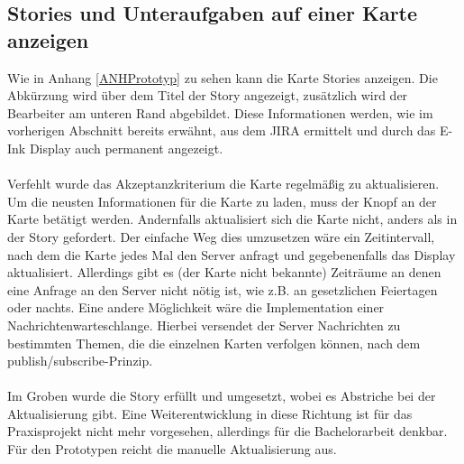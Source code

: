 \documentclass[12pt,titlepage]{scrartcl}
\begin{document}
			\subsection{Stories und Unteraufgaben auf einer Karte anzeigen}
			Wie in Anhang \ref{ANHPrototyp} zu sehen kann die Karte Stories anzeigen. Die Abkürzung wird über dem Titel der Story angezeigt, zusätzlich wird der Bearbeiter am unteren Rand abgebildet. Diese Informationen werden, wie im vorherigen Abschnitt bereits erwähnt, aus dem JIRA ermittelt und durch das E-Ink Display auch permanent angezeigt. \\ \\
			Verfehlt wurde das Akzeptanzkriterium die Karte regelmäßig zu aktualisieren. Um die neusten Informationen für die Karte zu laden, muss der Knopf an der Karte betätigt werden. Andernfalls aktualisiert sich die Karte nicht, anders als in der Story gefordert. Der einfache Weg dies umzusetzen wäre ein Zeitintervall, nach dem die Karte jedes Mal den Server anfragt und gegebenenfalls das Display aktualisiert. Allerdings gibt es (der Karte nicht bekannte) Zeiträume an denen eine Anfrage an den Server nicht nötig ist, wie z.B. an gesetzlichen Feiertagen oder nachts. Eine andere Möglichkeit wäre die Implementation einer Nachrichtenwarteschlange. Hierbei versendet der Server Nachrichten zu bestimmten Themen, die die einzelnen Karten verfolgen können, nach dem publish/subscribe-Prinzip. \\ \\
			Im Groben wurde die Story erfüllt und umgesetzt, wobei es Abstriche bei der Aktualisierung gibt. Eine Weiterentwicklung in diese Richtung ist für das Praxisprojekt nicht mehr vorgesehen, allerdings für die Bachelorarbeit denkbar. Für den Prototypen reicht die manuelle Aktualisierung aus.
\end{document}
